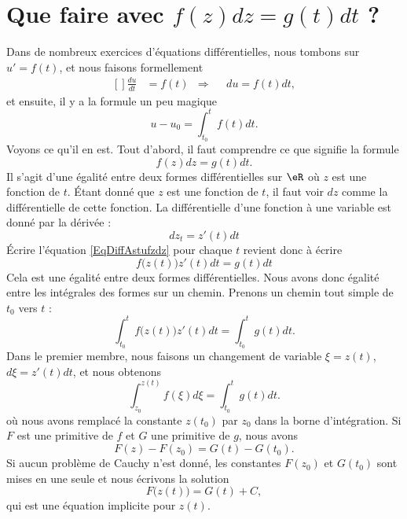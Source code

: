\section{Que faire avec \texorpdfstring{\( f(z)dz=g(t)dt\)}{fzdz} ?}
\label{SecFairedzdt}

Dans de nombreux exercices d'équations différentielles, nous tombons sur \( u'=f(t)\), et nous faisons formellement
\begin{equation}
	\begin{aligned}[]
		\frac{ du }{ dt } & =f(t) & \Rightarrow &  & du=f(t)dt,
	\end{aligned}
\end{equation}
et ensuite, il y a la formule un peu magique
\begin{equation}
	u-u_0=\int_{t_0}^tf(t)dt.
\end{equation}
Voyons ce qu'il en est. Tout d'abord, il faut comprendre ce que signifie la formule
\begin{equation}        \label{EqDiffAstufzdz}
	f(z)dz=g(t)dt.
\end{equation}
Il s'agit d'une égalité entre deux formes différentielles sur \( \eR\) où \( z\) est une fonction de \( t\).  Étant donné que \( z\) est une fonction de \( t\), il faut voir \( dz\) comme la différentielle de cette fonction. La différentielle d'une fonction à une variable est donné par la dérivée :
\begin{equation}
	dz_t=z'(t)dt
\end{equation}
Écrire l'équation \eqref{EqDiffAstufzdz} pour chaque \( t\) revient donc à écrire
\begin{equation}
	f\big( z(t) \big)z'(t)dt=g(t)dt
\end{equation}
Cela est une égalité entre deux formes différentielles. Nous avons donc égalité entre les intégrales des formes sur un chemin. Prenons un chemin tout simple de \( t_0\) vers \( t\) :
\begin{equation}
	\int_{t_0}^tf\big( z(t) \big)z'(t)dt=\int_{t_0}^tg(t)dt.
\end{equation}
Dans le premier membre, nous faisons un changement de variable \( \xi=z(t)\), \( d\xi=z'(t)dt\), et nous obtenons
\begin{equation}        \label{EqIntDiffAstuztz}
	\int_{z_0}^{z(t)}f(\xi)d\xi=\int_{t_0}^tg(t)dt.
\end{equation}
où nous avons remplacé la constante \( z(t_0)\) par \( z_0\) dans la borne d'intégration.  Si \( F\) est une primitive de \( f\) et \( G\) une primitive de \( g\), nous avons
\begin{equation}
	F(z)-F(z_0)=G(t)-G(t_0).
\end{equation}
Si aucun problème de Cauchy n'est donné, les constantes \( F(z_0)\) et \( G(t_0)\) sont mises en une seule et nous écrivons la solution
\begin{equation}
	F\big( z(t) \big)=G(t)+C,
\end{equation}
qui est une équation implicite pour \( z(t)\).

